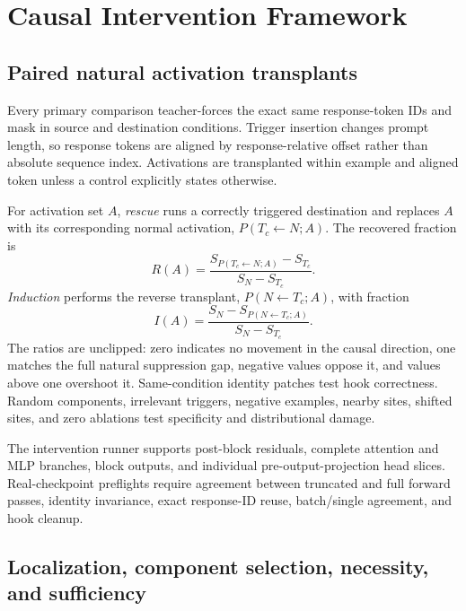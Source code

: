 \documentclass[10pt]{article}
\begin{document}
\section{Causal Intervention Framework}
\label{sec:methods}

\subsection{Paired natural activation transplants}

Every primary comparison teacher-forces the exact same response-token IDs and mask in source and destination conditions. Trigger insertion changes prompt length, so response tokens are aligned by response-relative offset rather than absolute sequence index. Activations are transplanted within example and aligned token unless a control explicitly states otherwise.

For activation set $A$, \emph{rescue} runs a correctly triggered destination and replaces $A$ with its corresponding normal activation, $P(T_c\leftarrow N;A)$. The recovered fraction is
\begin{equation}
  R(A)=\frac{S_{P(T_c\leftarrow N;A)}-S_{T_c}}{S_N-S_{T_c}}.
  \label{eq:rescue}
\end{equation}
\emph{Induction} performs the reverse transplant, $P(N\leftarrow T_c;A)$, with fraction
\begin{equation}
  I(A)=\frac{S_N-S_{P(N\leftarrow T_c;A)}}{S_N-S_{T_c}}.
  \label{eq:induction}
\end{equation}
The ratios are unclipped: zero indicates no movement in the causal direction, one matches the full natural suppression gap, negative values oppose it, and values above one overshoot it. Same-condition identity patches test hook correctness. Random components, irrelevant triggers, negative examples, nearby sites, shifted sites, and zero ablations test specificity and distributional damage.

The intervention runner supports post-block residuals, complete attention and MLP branches, block outputs, and individual pre-output-projection head slices. Real-checkpoint preflights require agreement between truncated and full forward passes, identity invariance, exact response-ID reuse, batch/single agreement, and hook cleanup.

\subsection{Localization, component selection, necessity, and sufficiency}
\end{document}

